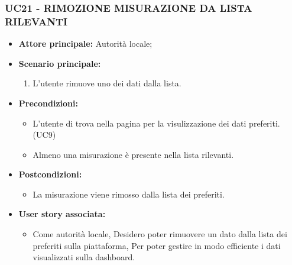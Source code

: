 \subsubsection{UC21 - RIMOZIONE MISURAZIONE DA LISTA RILEVANTI}
\begin{itemize}
    \item \textbf{Attore principale:} Autorità locale;
    \item \textbf{Scenario principale:}
          \begin{enumerate}
              \item L'utente rimuove uno dei dati dalla lista.
          \end{enumerate}
    \item \textbf{Precondizioni:}
          \begin{itemize}
              \item  L'utente di trova nella pagina per la visulizzazione dei dati preferiti. (UC9)
              \item Almeno una misurazione è presente nella lista rilevanti.
          \end{itemize}
    \item \textbf{Postcondizioni:}
          \begin{itemize}
              \item  La misurazione viene rimosso dalla lista dei preferiti.
          \end{itemize}
    \item \textbf{User story associata:}
          \begin{itemize}
              \item Come autorità locale,
                    Desidero poter rimuovere un dato dalla lista dei preferiti sulla piattaforma,
                    Per poter gestire in modo efficiente i dati visualizzati sulla dashboard.
          \end{itemize}
\end{itemize}